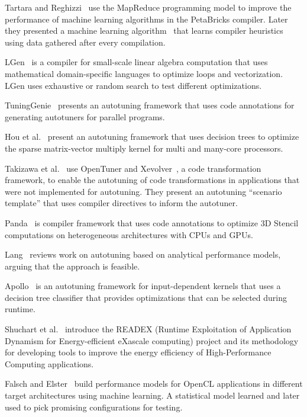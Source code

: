 Tartara and Reghizzi~\cite{tartara2012parallel} use the MapReduce programming
model to improve the performance of machine learning algorithms in the
PetaBricks compiler. Later they presented a machine learning
algorithm~\cite{tartara2013continuous} that learns compiler heuristics using
data gathered after every compilation.

LGen~\cite{spampinato2014basic} is a compiler for small-scale linear algebra
computation that uses mathematical domain-specific languages to optimize loops
and vectorization. LGen uses exhaustive or random search to test different
optimizations.

TuningGenie~\cite{ivanenko2014method} presents an autotuning framework that
uses code annotations for generating autotuners for parallel programs.

Hou et al.~\cite{hou2017auto} present an autotuning framework that uses
decision trees to optimize the sparse matrix-vector multiply kernel
for multi and many-core processors.

Takizawa et al.~\cite{takizawa2017customizable} use OpenTuner and
Xevolver~\cite{takizawa2014xevolver}, a code transformation framework, to
enable the autotuning of code transformations in applications that were not
implemented for autotuning. They present an autotuning ``scenario template''
that uses compiler directives to inform the autotuner.

Panda~\cite{sourouri2017panda} is compiler framework that uses code annotations
to optimize 3D Stencil computations on heterogeneous architectures with CPUs
and GPUs.

Lang~\cite{lang2017data} reviews work on autotuning based on analytical
performance models, arguing that the approach is feasible.

Apollo~\cite{beckingsale2017apollo} is an autotuning framework for
input-dependent kernels that uses a decision tree classifier that provides
optimizations that can be selected during runtime.

Shuchart et al.~\cite{schuchart2017readex} introduce the READEX (Runtime
Exploitation of Application Dynamism for Energy-efficient eXascale computing)
project and its methodology for developing tools to improve the energy
efficiency of High-Performance Computing applications.

Falsch and Elster~\cite{falch2017machine} build performance models for
OpenCL applications in different target architectures using machine learning.
A statistical model learned and later used to pick promising configurations for
testing.

